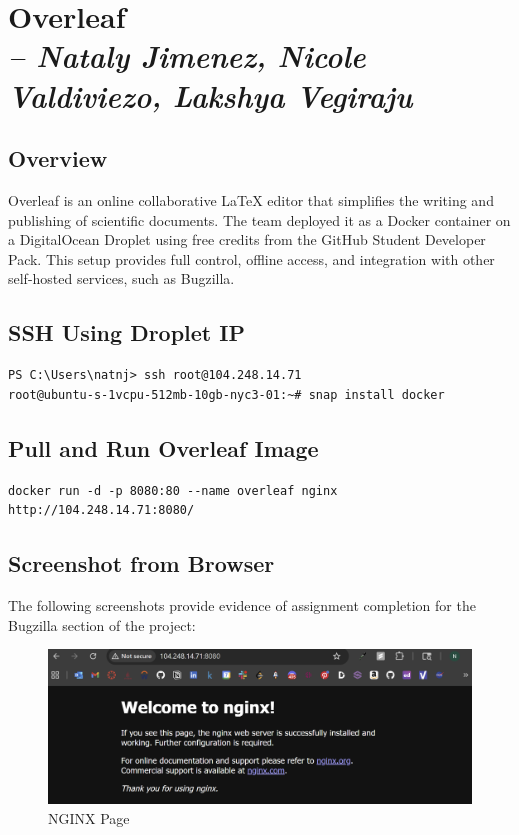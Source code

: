 \chapter{Overleaf \\
\small{\textit{-- Nataly Jimenez, Nicole Valdiviezo, Lakshya Vegiraju}}
\label{Chapter::Overleaf}}

\section{Overview}
Overleaf is an online collaborative \LaTeX{} editor that simplifies the writing and publishing of scientific documents. The team deployed it as a Docker container on a DigitalOcean Droplet using free credits from the GitHub Student Developer Pack. This setup provides full control, offline access, and integration with other self-hosted services, such as Bugzilla.

\section{SSH Using Droplet IP}
\begin{verbatim}
PS C:\Users\natnj> ssh root@104.248.14.71
root@ubuntu-s-1vcpu-512mb-10gb-nyc3-01:~# snap install docker
\end{verbatim}

\section{Pull and Run Overleaf Image}
\begin{verbatim}
docker run -d -p 8080:80 --name overleaf nginx
http://104.248.14.71:8080/
\end{verbatim}

\section{Screenshot from Browser}
The following screenshots provide evidence of assignment completion for the Bugzilla section of the project:

\begin{figure}[ht]
    \centering
    \includegraphics[width=0.6\linewidth]{Book_SSW590 (1)/eps/Screenshots/Overleaf_6.png}
    \caption{NGINX Page}
    \label{NGINX Page}
\end{figure}
